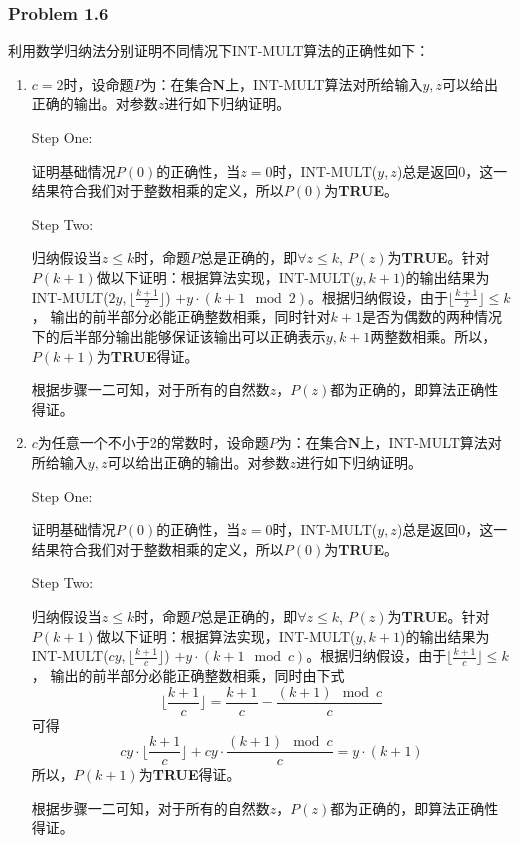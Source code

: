\documentclass[UTF8,12pt]{article} %
\makeatletter
\theoremstyle{definition}
\newenvironment{proof}[1][\protect\proofname]{\par
\normalfont\topsep6\p@\@plus6\p@\relax
\trivlist
\itemindent\parindent
\item[\hskip\labelsep
\scshape
#1]\ignorespaces
}{%
\endtrivlist\@endpefalse
}
\renewcommand{\proofname}{\it{\textbf{证明}}}
\makeatother
\begin{document}
\subsubsection*{Problem 1.6}
\begin{proof}
利用数学归纳法分别证明不同情况下INT-MULT算法的正确性如下：
\begin{enumerate}[1)]
	\item $c=2$时，设命题$P$为：在集合$\textbf{N}$上，INT-MULT算法对所给输入$y, z$可以给出正确的输出。对参数$z$进行如下归纳证明。

	Step One:

证明基础情况$P(0)$的正确性，当$z=0$时，INT-MULT($y, z$)总是返回$0$，这一结果符合我们对于整数相乘的定义，所以$P(0)$为\textbf{TRUE}。

	Step Two:

	归纳假设当$z \leq k$时，命题$P$总是正确的，即$\forall z \leq k$, $P(z)$为\textbf{TRUE}。针对$P(k+1)$做以下证明：根据算法实现，INT-MULT($y, k+1$)的输出结果为INT-MULT($2y, \lfloor \displaystyle\frac{k+1}{2} \rfloor$) $+ y\cdot (k+1 \mod 2)$。根据归纳假设，由于$\lfloor \displaystyle\frac{k+1}{2} \rfloor \leq k$， 输出的前半部分必能正确整数相乘，同时针对$k+1$是否为偶数的两种情况下的后半部分输出能够保证该输出可以正确表示$y, k+1$两整数相乘。所以，$P(k+1)$为\textbf{TRUE}得证。

	根据步骤一二可知，对于所有的自然数$z$，$P(z)$都为正确的，即算法正确性得证。

	\item  $c$为任意一个不小于2的常数时，设命题$P$为：在集合$\textbf{N}$上，INT-MULT算法对所给输入$y, z$可以给出正确的输出。对参数$z$进行如下归纳证明。

	Step One:

证明基础情况$P(0)$的正确性，当$z=0$时，INT-MULT($y, z$)总是返回$0$，这一结果符合我们对于整数相乘的定义，所以$P(0)$为\textbf{TRUE}。

	Step Two:

	归纳假设当$z \leq k$时，命题$P$总是正确的，即$\forall z \leq k$, $P(z)$为\textbf{TRUE}。针对$P(k+1)$做以下证明：根据算法实现，INT-MULT($y, k+1$)的输出结果为INT-MULT($cy, \lfloor \displaystyle\frac{k+1}{c} \rfloor$) $+ y\cdot (k+1 \mod c)$。根据归纳假设，由于$\lfloor \displaystyle\frac{k+1}{c} \rfloor \leq k$， 输出的前半部分必能正确整数相乘，同时由下式\[\lfloor \displaystyle\frac{k+1}{c} \rfloor = \displaystyle\frac{k+1}{c} - \displaystyle\frac{(k+1)\mod c}{c} \] 可得 \[cy \cdot \lfloor \displaystyle\frac{k+1}{c} \rfloor + cy \cdot \displaystyle\frac{(k+1)\mod c}{c} = y \cdot (k+1)\]所以，$P(k+1)$为\textbf{TRUE}得证。

	根据步骤一二可知，对于所有的自然数$z$，$P(z)$都为正确的，即算法正确性得证。
\end{enumerate}
\end{proof}
\end{document}
